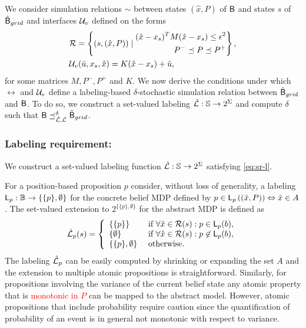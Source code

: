 \documentclass{ifacconf}
\begin{document}
We consider simulation relations $\sim$ between states $(\hat x, P)$ of $\mathsf{B}$ and states $s$ of $\hat {\mathsf{B}}_{grid}$ and interfaces $\mathcal{U}_{v}$ defined on the forms 
\begin{align}
  \label{eq:rel}
    & \mathcal{R} = \left\{(s, (\hat x, P ) ) \mid \begin{aligned}
      (\hat x-x_s)^T M(\hat x-x_s)\leq \epsilon^2 \\
      P^-\preceq P \preceq   P^+
    \end{aligned} \right \}, \\
    & \mathcal{U}_{v}(\tilde u,  x_s, \hat x)  =K( \hat x - x_s)+\tilde u,   
\end{align} 
for some matrices $M, P^-, P^+$ and $K$. We now derive the conditions under which $\rel$ and $\mathcal{U}_{v}$ define a labeling-based $\delta$-stochastic simulation relation between $\hat {\mathsf{B}}_{grid}$ and $\mathsf{B}$. To do so, we construct a set-valued labeling $\hat {\mathcal{L}}: \mathbb{S} \rightarrow 2^\Sigma$ and compute $\delta$ such that $\mathsf{B}\preceq^\delta_{\hat{\mathcal{L}},\mathcal{L}}\hat {\mathsf{B}}_{grid}$.

\subsubsection{Labeling requirement:}

We construct a set-valued labeling function $\hat {\mathcal{L}}: \mathbb{S} \rightarrow 2^\Sigma$ satisfying \eqref{eq:sr-l}.

For a position-based proposition $p$ consider, without loss of generality, a labeling $\mathsf{L}_p: \mathbb{B} \rightarrow \{\{p\},\emptyset\}$ for the concrete belief MDP defined by $p\in\mathsf{L}_p \left( (\hat x,P) \right)  \Leftrightarrow \hat x \in A$. The set-valued extension to $2^{\{\{p\},\emptyset\}}$ for the abstract MDP is defined as
 \begin{align}
 	\hat {\mathcal{L}}_p(s) =\left\{\begin{array}{ll} \{\{p\}\} & \mbox{ if } \forall \hat x \in \mathcal{R} (s):p\in\mathsf{L}_p(b), \\
 	  \{\emptyset \} & \mbox{ if } \forall \hat x \in \mathcal{R} (s):p\not\in\mathsf{L}_p(b),\\
 	  \{\{p\},\emptyset\}&\mbox{ otherwise.}\end{array} \right.
 \end{align}
The labeling $\hat {\mathcal{L}}_p$ can be easily computed by shrinking or expanding the set $A$ and the extension to multiple atomic propositions is straightforward. Similarly, for propositions involving the variance of the current belief state any atomic property that is \textcolor{red}{monotonic in $P$} can be mapped to the abstract model. However, atomic propositions that include probability require caution since the quantification of probability of an event is in general not monotonic with respect to variance.
\end{document}
